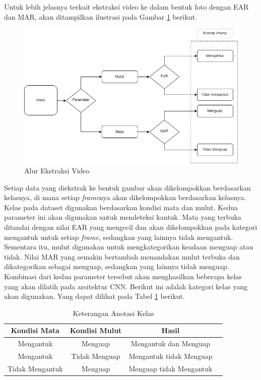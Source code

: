     Untuk lebih jelasnya terkait ekstraksi video ke dalam bentuk foto dengan EAR dan MAR, akan ditampilkan ilustrasi pada Gambar \ref{Alur Ekstraksi Video} berikut.
    
  
    \begin{figure}[H]
        \includegraphics[width=1.0\textwidth]{figures/bab3/procesing.png}
        \caption{Alur Ekstraksi Video}
        \label{Alur Ekstraksi Video}
    \end{figure}

    

    

    
    Setiap data yang diekstrak ke bentuk gambar akan dikelompokkan berdasarkan kelasnya, di mana setiap \textit{frame}nya akan dikelompokkan berdasarkan kelasnya. Kelas pada dataset digunakan berdasarkan kondisi mata dan mulut. Kedua parameter ini akan digunakan untuk mendeteksi kantuk. Mata yang terbuka ditandai dengan nilai EAR yang mengecil dan akan dikelompokkan pada kategori mengantuk untuk setiap \textit{frame}, sedangkan yang lainnya tidak mengantuk. Sementara itu, mulut digunakan untuk mengkategorikan keadaan menguap atau tidak. Nilai MAR yang semakin bertambah menandakan mulut terbuka dan dikategorikan sebagai menguap, sedangkan yang lainnya tidak menguap. Kombinasi dari kedua parameter tersebut akan menghasilkan beberapa kelas yang akan dilatih pada arsitektur CNN. Berikut ini adalah kategori kelas yang akan digunakan. Yang dapat dilihat pada Tabel \ref{Keterangan Anotasi Kelas} berikut.


    
    \begin{table}[h]
        \centering
        \caption{Keterangan Anotasi Kelas}
        \begin{tabular}{cccc}
            \hline
            \textbf{Kondisi Mata} & \textbf{Kondisi Mulut} & \textbf{Hasil} \\
            \midrule Mengantuk & Menguap &  Mengantuk dan Menguap\\
                     Mengantuk & Tidak Menguap &  Mengantuk tidak Menguap \\
                     Tidak Mengantuk & Menguap &  Menguap tidak Mengantuk\\
                
        
            \bottomrule
        \end{tabular}
        \label{Keterangan Anotasi Kelas}
    \end{table}
    

